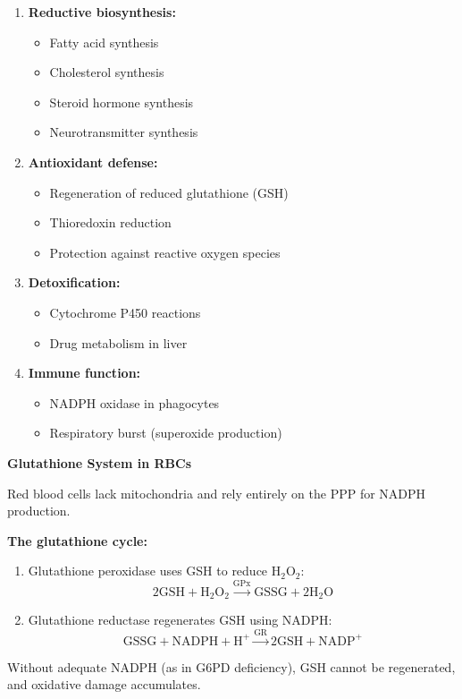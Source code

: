 \begin{enumerate}
    \item \textbf{Reductive biosynthesis:}
    \begin{itemize}
        \item Fatty acid synthesis
        \item Cholesterol synthesis
        \item Steroid hormone synthesis
        \item Neurotransmitter synthesis
    \end{itemize}
    
    \item \textbf{Antioxidant defense:}
    \begin{itemize}
        \item Regeneration of reduced glutathione (GSH)
        \item Thioredoxin reduction
        \item Protection against reactive oxygen species
    \end{itemize}
    
    \item \textbf{Detoxification:}
    \begin{itemize}
        \item Cytochrome P450 reactions
        \item Drug metabolism in liver
    \end{itemize}
    
    \item \textbf{Immune function:}
    \begin{itemize}
        \item NADPH oxidase in phagocytes
        \item Respiratory burst (superoxide production)
    \end{itemize}
\end{enumerate}

\begin{example}
\textbf{Glutathione System in RBCs}

Red blood cells lack mitochondria and rely entirely on the PPP for NADPH production.

\textbf{The glutathione cycle:}
\begin{enumerate}
    \item Glutathione peroxidase uses GSH to reduce H$_2$O$_2$:
    \[
    2\text{GSH} + \text{H}_2\text{O}_2 \xrightarrow{\text{GPx}} \text{GSSG} + 2\text{H}_2\text{O}
    \]
    
    \item Glutathione reductase regenerates GSH using NADPH:
    \[
    \text{GSSG} + \text{NADPH} + \text{H}^+ \xrightarrow{\text{GR}} 2\text{GSH} + \text{NADP}^+
    \]
\end{enumerate}

Without adequate NADPH (as in G6PD deficiency), GSH cannot be regenerated, and oxidative damage accumulates.
\end{example}

